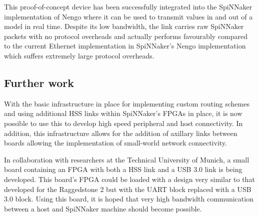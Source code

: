 				This proof-of-concept device has been successfully integrated into the
				SpiNNaker implementation of Nengo where it can be used to transmit
				values in and out of a model in real time. Despite its low bandwidth,
				the link carries raw SpiNNaker packets with no protocol overheads and
				actually performs favourably compared to the current Ethernet
				implementation in SpiNNaker's Nengo implementation which suffers
				extremely large protocol overheads.
			
			\subsection{Further work}
				
				
				With the basic infrastructure in place for implementing custom routing
				schemes and using additional HSS links within SpiNNaker's FPGAs in
				place, it is now possible to use this to develop high speed peripheral
				and host connectivity. In addition, this infrastructure allows for the
				addition of axillary links between boards allowing the implementation of
				small-world network connectivity.
				
				In collaboration with researchers at the Technical University of Munich,
				a small board containing an FPGA with both a HSS link and a USB 3.0 link
				is being developed. This board's FPGA could be loaded with a design very
				similar to that developed for the Raggedstone 2 but with the UART block
				replaced with a USB 3.0 block. Using this board, it is hoped that very
				high bandwidth communication between a host and SpiNNaker machine should
				become possible.

